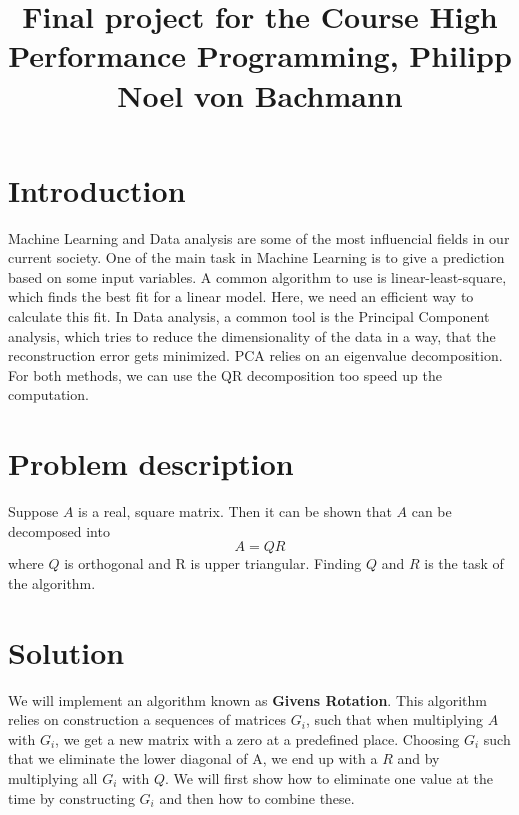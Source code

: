 \documentclass[a4paper]{scrartcl}
\title{Final project for the Course High Performance Programming, Philipp Noel von Bachmann}
\begin{document}
\maketitle
\section{Introduction}
    Machine Learning and Data analysis are some of the most influencial fields
    in our current society. One of the main task in Machine Learning is to give
    a prediction based on some input variables. A common algorithm to use is
    linear-least-square, which finds the best fit for a linear model. Here, we
    need an efficient way to calculate this fit. In Data analysis, a common tool
    is the Principal Component analysis, which tries to reduce the
    dimensionality of the data in a way, that the reconstruction error gets
    minimized. PCA relies on an eigenvalue decomposition. For both methods, we
    can use the QR decomposition too speed up the computation.


\section{Problem description}
    Suppose $A$ is a real, square matrix. Then it can be shown that $A$ can be
    decomposed into 
    \begin{equation}\label{eq:QR}
        A = QR
    \end{equation}
    where $Q$ is orthogonal and R is upper triangular. Finding $Q$ and $R$ is
    the task of the algorithm.

\section{Solution}
    We will implement an algorithm known as \textbf{Givens Rotation}. This
    algorithm relies on construction a sequences of matrices $G_i$, such that
    when multiplying $A$ with $G_i$, we get a new matrix with a zero at a
    predefined place. Choosing $G_i$ such that we eliminate the lower diagonal
    of A, we end up with a $R$ and by multiplying all $G_i$ with $Q$. We will
    first show how to eliminate one value at the time by constructing $G_i$ and
    then how to combine these.
\end{document}

